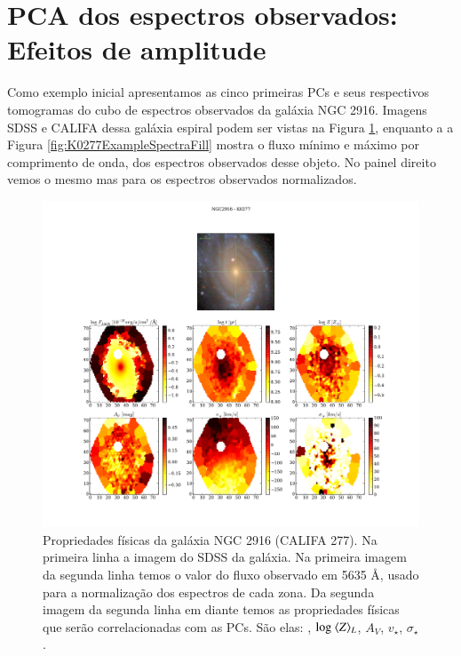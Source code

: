 \section{PCA dos espectros observados: Efeitos de amplitude}
\label{sec:PCAaplic:norm}

Como exemplo inicial apresentamos as cinco primeiras PCs e seus respectivos tomogramas do cubo de espectros observados
da galáxia NGC 2916. Imagens SDSS e CALIFA dessa galáxia espiral podem ser vistas na Figura \ref{fig:K0277apresent},
enquanto a a Figura \ref{fig:K0277ExampleSpectraFill} mostra o fluxo mínimo e máximo por comprimento de onda, dos
espectros observados desse objeto. No painel direito vemos o mesmo mas para os espectros observados normalizados.

\begin{figure}
    \includegraphics[width=1.\textwidth]{figuras/K0277-apresent.pdf}
    \caption[Propriedades f\'isicas da gal\'axia NGC 2916 (CALIFA 277).]
    {Propriedades físicas da galáxia NGC 2916 (CALIFA 277). Na primeira linha a imagem do SDSS da galáxia. Na primeira
    imagem da segunda linha temos o valor do fluxo observado em 5635 \AA, usado para a normalização dos espectros de
    cada zona. Da segunda imagem da segunda linha em diante temos as propriedades físicas que serão correlacionadas com
    as PCs. São elas: , $\log\ \meanL{Z}$, $A_V$, $v_{\star}$, $\sigma_{\star}$.}
    \label{fig:K0277apresent}
\end{figure}

